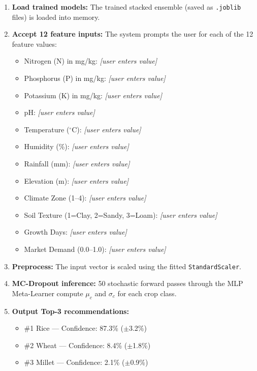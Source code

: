 \documentclass[12pt,a4paper,oneside]{report}
\begin{document}
\begin{enumerate}[leftmargin=*, label=\textbf{Step \arabic*.}]
  \item \textbf{Load trained models:} The trained stacked ensemble (saved as \texttt{.joblib} files) is loaded into memory.

  \item \textbf{Accept 12 feature inputs:} The system prompts the user for each of the 12 feature values:
  \begin{singlespacing}
  \begin{itemize}[leftmargin=*, label=$>$]
    \item Nitrogen (N) in mg/kg: \textit{[user enters value]}
    \item Phosphorus (P) in mg/kg: \textit{[user enters value]}
    \item Potassium (K) in mg/kg: \textit{[user enters value]}
    \item pH: \textit{[user enters value]}
    \item Temperature ($^\circ$C): \textit{[user enters value]}
    \item Humidity (\%): \textit{[user enters value]}
    \item Rainfall (mm): \textit{[user enters value]}
    \item Elevation (m): \textit{[user enters value]}
    \item Climate Zone (1--4): \textit{[user enters value]}
    \item Soil Texture (1=Clay, 2=Sandy, 3=Loam): \textit{[user enters value]}
    \item Growth Days: \textit{[user enters value]}
    \item Market Demand (0.0--1.0): \textit{[user enters value]}
  \end{itemize}
  \end{singlespacing}

  \item \textbf{Preprocess:} The input vector is scaled using the fitted \texttt{StandardScaler}.

  \item \textbf{MC-Dropout inference:} 50 stochastic forward passes through the MLP Meta-Learner compute $\mu_c$ and $\sigma_c$ for each crop class.

  \item \textbf{Output Top-3 recommendations:}
  \begin{singlespacing}
  \begin{itemize}[leftmargin=*, label=$\bullet$]
    \item \#1 Rice --- Confidence: 87.3\% ($\pm$3.2\%)
    \item \#2 Wheat --- Confidence: 8.4\% ($\pm$1.8\%)
    \item \#3 Millet --- Confidence: 2.1\% ($\pm$0.9\%)
  \end{itemize}
  \end{singlespacing}


\end{enumerate}
\end{document}

